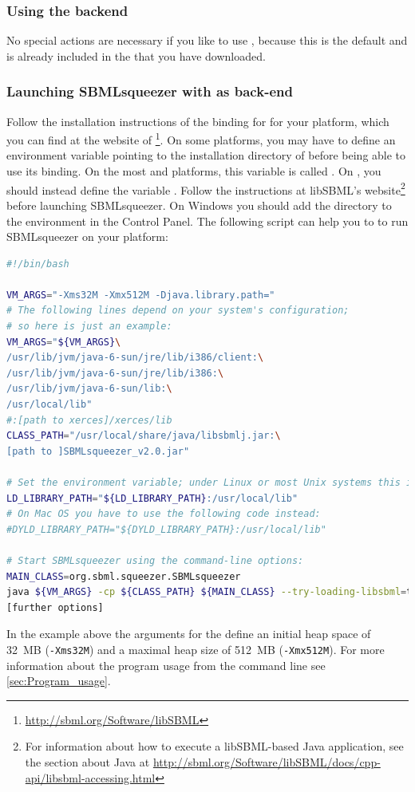 \subsubsection{Using the \JSBML backend}

No special actions are necessary if you like to use \JSBML, because this is the
default and \JSBML is already included in the \JAR that you have downloaded.

\subsubsection{Launching SBMLsqueezer with \libSBML as back-end}
\label{sec:UsingLibSBML}
Follow the installation instructions of the \Java binding for \libSBML for your
platform, which you can find at the website of
\libSBML\footnote{\url{http://sbml.org/Software/libSBML}}.
On some platforms, you may have to define an environment variable pointing
to the installation directory of \libSBML before being able to use its \Java
binding.
On the most \Unix and \Linux platforms, this variable is called
\LDLIBRARYPATH.
On \MacOSX, you should instead define the variable \DYLDLIBRARYPATH.
Follow the instructions at libSBML's website\footnote{For information about how to execute a libSBML-based Java application, see the section about Java at \href{http://sbml.org/Software/libSBML/docs/cpp-api/libsbml-accessing.html}{\url{http://sbml.org/Software/libSBML/docs/cpp-api/libsbml-accessing.html}}} %
before launching SBMLsqueezer.
On Windows you should add the \libSBML directory to the \PATH environment in the Control Panel.
The following script can help you to to run SBMLsqueezer on your \Unix platform:
\begin{lstlisting}[language=bash, caption={Example Bash script that launches SBMLsqueezer with a \libSBML back-end}]
#!/bin/bash

VM_ARGS="-Xms32M -Xmx512M -Djava.library.path="
# The following lines depend on your system's configuration;
# so here is just an example:
VM_ARGS="${VM_ARGS}\
/usr/lib/jvm/java-6-sun/jre/lib/i386/client:\
/usr/lib/jvm/java-6-sun/jre/lib/i386:\
/usr/lib/jvm/java-6-sun/lib:\
/usr/local/lib"
#:[path to xerces]/xerces/lib
CLASS_PATH="/usr/local/share/java/libsbmlj.jar:\
[path to ]SBMLsqueezer_v2.0.jar"

# Set the environment variable; under Linux or most Unix systems this is
LD_LIBRARY_PATH="${LD_LIBRARY_PATH}:/usr/local/lib"
# On Mac OS you have to use the following code instead:
#DYLD_LIBRARY_PATH="${DYLD_LIBRARY_PATH}:/usr/local/lib"

# Start SBMLsqueezer using the command-line options:
MAIN_CLASS=org.sbml.squeezer.SBMLsqueezer 
java ${VM_ARGS} -cp ${CLASS_PATH} ${MAIN_CLASS} --try-loading-libsbml=true\
[further options]
\end{lstlisting}
In the example above the arguments for the \JVM define an initial heap space of
32~MB (\texttt{-Xms32M}) and a maximal heap size of 512~MB (\texttt{-Xmx512M}).
For more information about the program usage from the command line see \vref{sec:Program_usage}.


